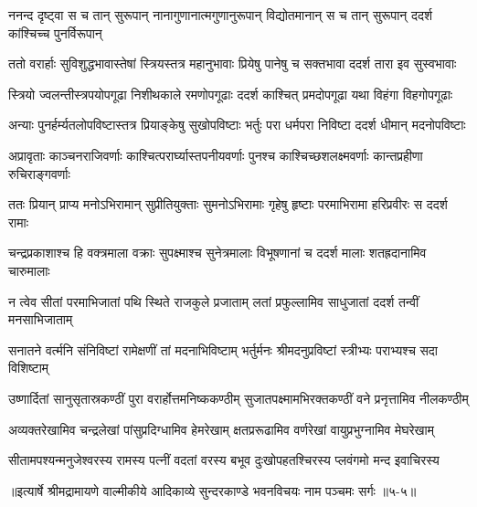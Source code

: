 \twolineshloka
{ननन्द दृष्ट्वा स च तान् सुरूपान् नानागुणानात्मगुणानुरूपान्}
{विद्योतमानान् स च तान् सुरूपान् ददर्श कांश्चिच्च पुनर्विरूपान्} %

\twolineshloka
{ततो वरार्हाः सुविशुद्धभावास्तेषां स्त्रियस्तत्र महानुभावाः}
{प्रियेषु पानेषु च सक्तभावा ददर्श तारा इव सुस्वभावाः} %

\twolineshloka
{स्त्रियो ज्वलन्तीस्त्रपयोपगूढा निशीथकाले रमणोपगूढाः}
{ददर्श काश्चित् प्रमदोपगूढा यथा विहंगा विहगोपगूढाः} %

\twolineshloka
{अन्याः पुनर्हर्म्यतलोपविष्टास्तत्र प्रियाङ्केषु सुखोपविष्टाः}
{भर्तुः परा धर्मपरा निविष्टा ददर्श धीमान् मदनोपविष्टाः} %

\twolineshloka
{अप्रावृताः काञ्चनराजिवर्णाः काश्चित्परार्घ्यास्तपनीयवर्णाः}
{पुनश्च काश्चिच्छशलक्ष्मवर्णाः कान्तप्रहीणा रुचिराङ्गवर्णाः} %

\twolineshloka
{ततः प्रियान् प्राप्य मनोऽभिरामान् सुप्रीतियुक्ताः सुमनोऽभिरामाः}
{गृहेषु हृष्टाः परमाभिरामा हरिप्रवीरः स ददर्श रामाः} %

\twolineshloka
{चन्द्रप्रकाशाश्च हि वक्त्रमाला वक्राः सुपक्ष्माश्च सुनेत्रमालाः}
{विभूषणानां च ददर्श मालाः शतह्रदानामिव चारुमालाः} %

\twolineshloka
{न त्वेव सीतां परमाभिजातां पथि स्थिते राजकुले प्रजाताम्}
{लतां प्रफुल्लामिव साधुजातां ददर्श तन्वीं मनसाभिजाताम्} %

\twolineshloka
{सनातने वर्त्मनि संनिविष्टां रामेक्षणीं तां मदनाभिविष्टाम्}
{भर्तुर्मनः श्रीमदनुप्रविष्टां स्त्रीभ्यः पराभ्यश्च सदा विशिष्टाम्} %

\twolineshloka
{उष्णार्दितां सानुसृतास्रकण्ठीं पुरा वरार्होत्तमनिष्ककण्ठीम्}
{सुजातपक्ष्मामभिरक्तकण्ठीं वने प्रनृत्तामिव नीलकण्ठीम्} %

\twolineshloka
{अव्यक्तरेखामिव चन्द्रलेखां पांसुप्रदिग्धामिव हेमरेखाम्}
{क्षतप्ररूढामिव वर्णरेखां वायुप्रभुग्नामिव मेघरेखाम्} %

\twolineshloka
{सीतामपश्यन्मनुजेश्वरस्य रामस्य पत्नीं वदतां वरस्य}
{बभूव दुःखोपहतश्चिरस्य प्लवंगमो मन्द इवाचिरस्य} %


॥इत्यार्षे श्रीमद्रामायणे वाल्मीकीये आदिकाव्ये सुन्दरकाण्डे भवनविचयः नाम पञ्चमः सर्गः ॥५-५॥
